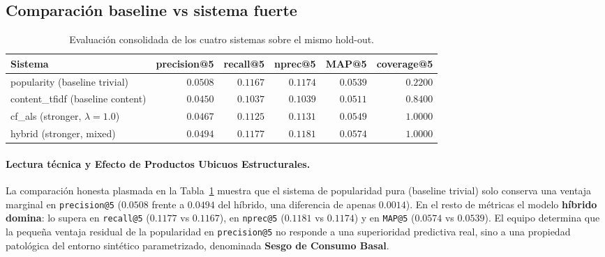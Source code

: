 \documentclass[12pt,a4paper]{article}
\newcommand{\code}[1]{\texttt{\small #1}}
\begin{document}
\subsection{Comparación baseline vs sistema fuerte}

\begin{table}[H]
\centering
\caption{Evaluación consolidada de los cuatro sistemas sobre el mismo hold-out.}
\label{tab:consol}
\begin{tabular}{lrrrrr}
\toprule
Sistema & precision@5 & recall@5 & nprec@5 & MAP@5 & coverage@5 \\
\midrule
popularity     (baseline trivial) & $\mathbf{0.0508}$ & $0.1167$ & $0.1174$ & $0.0539$ & $0.2200$ \\
content\_tfidf (baseline content) & $0.0450$ & $0.1037$ & $0.1039$ & $0.0511$ & $0.8400$ \\
cf\_als         (stronger, $\lambda{=}1.0$) & $0.0467$ & $0.1125$ & $0.1131$ & $0.0549$ & $\mathbf{1.0000}$ \\
\rowcolor{green!12}
hybrid          (stronger, mixed) & $0.0494$ & $\mathbf{0.1177}$ & $\mathbf{0.1181}$ & $\mathbf{0.0574}$ & $\mathbf{1.0000}$ \\
\bottomrule
\end{tabular}
\end{table}

\paragraph{Lectura técnica y Efecto de Productos Ubicuos Estructurales.} 
La comparación honesta plasmada en la Tabla~\ref{tab:consol} muestra que el sistema de popularidad pura (baseline trivial) solo conserva una ventaja marginal en \code{precision@5} ($0.0508$ frente a $0.0494$ del híbrido, una diferencia de apenas $0.0014$). En el resto de métricas el modelo \textbf{híbrido domina}: lo supera en \code{recall@5} ($0.1177$ vs $0.1167$), en \code{nprec@5} ($0.1181$ vs $0.1174$) y en \code{MAP@5} ($0.0574$ vs $0.0539$). El equipo determina que la pequeña ventaja residual de la popularidad en \code{precision@5} no responde a una superioridad predictiva real, sino a una propiedad patológica del entorno sintético parametrizado, denominada \textbf{Sesgo de Consumo Basal}.
\end{document}
